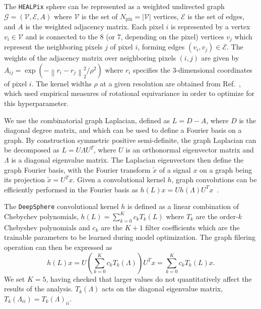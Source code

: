 \documentclass[prd,aps,10pt,nofootinbib,twocolumn,superscriptaddress,preprintnumbers,balancelastpage,longbibliography]{revtex4-1}
\begin{document}
The \texttt{HEALPix} sphere can be represented as a weighted undirected graph $\mathcal G = (\mathcal V, \mathcal E, A)$ where $\mathcal V$ is the set of $N_\mathrm{pix} = |\mathcal V|$ vertices, $\mathcal E$ is the set of edges, and $A$ is the weighted adjacency matrix. Each pixel $i$ is represented by a vertex $v_i \in \mathcal V$ and is connected to the 8 (or 7, depending on the pixel)
vertices $v_j$ which represent the neighboring pixels $j$ of pixel $i$, forming edges $(v_i
, v_j) \in \mathcal E$. The weights of the adjacency matrix over neighboring pixels $(i, j)$ are given by $A_{ij} = \exp \left(-{\left\|r_{i}-r_{j}\right\|_{2}^{2}}/{\rho^{2}}\right)$ where $r_i$ specifies the 3-dimensional coordinates of pixel $i$. The kernel widths $\rho$ at a given \HEALPix resolution are obtained from Ref.~\cite{defferrard2020deepsphere}, which used empirical measures of rotational equivariance in order to optimize for this hyperparameter.

We use the combinatorial graph Laplacian, defined as $ L =  D -  A$, where $ D$ is the diagonal degree matrix, and which can be used to define a Fourier basis on a graph. By construction symmetric positive semi-definite, the graph Laplacian can be decomposed as $ L =  U  \Lambda  U^T$, where $ U$ is an orthonormal eigenvector matrix and $ \Lambda$ is a diagonal eigenvalue matrix. The Laplacian eigenvectors then define the graph Fourier basis, with the Fourier transform $\tilde{ x}$ of a signal $ x$ on a graph being its projection $\tilde{x} =  U^T  x$.
Given a convolutional kernel $h$, graph convolutions can be efficiently performed in the Fourier basis as $h({L}) {x}={U} h({\Lambda}) {U}^{T} {x}$~\cite{defferrard2016convolutional}.

The \texttt{DeepSphere} convolutional kernel $h$ is defined as a linear combination of Chebychev polynomials, $h({{L}}) = \sum_{k=0}^{K} c_{k} T_{k}({{L}})$ where $T_k$ are the order-$k$ Chebyshev polynomials and $c_k$ are the $K + 1$ filter coefficients which are the trainable parameters to be learned during model optimization. The graph filering operation can then be expressed as
\begin{equation}
h({L}) {x}={U}\left(\sum_{k=0}^{K} c_{k} T_k({\Lambda})\right) {U}^{T} {x}=\sum_{k=0}^{K} c_{k} T_k({L}) {x}.
\end{equation}
We set $K=5$, having checked that larger values do not quantitatively affect the results of the analysis. $T_k({\Lambda})$ acts on the diagonal eigenvalue matrix, $T_k({\Lambda_{ii}}) = T_k({\Lambda})_{ii}$. 
\end{document}
